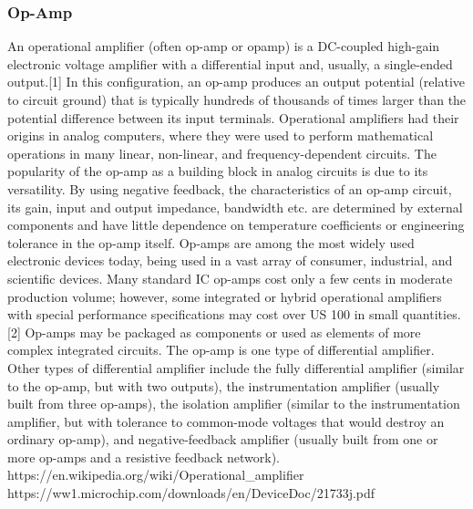 \subsubsection{Op-Amp}
An operational amplifier (often op-amp or opamp) is a DC-coupled high-gain electronic 
voltage amplifier with a differential input and, usually, a single-ended output.[1] In 
this configuration, an op-amp produces an output potential (relative to circuit ground) 
that is typically hundreds of thousands of times larger than the potential difference 
between its input terminals. Operational amplifiers had their origins in analog computers, 
where they were used to perform mathematical operations in many linear, non-linear, and 
frequency-dependent circuits.
The popularity of the op-amp as a building block in analog circuits is due to its 
versatility. By using negative feedback, the characteristics of an op-amp circuit, its 
gain, input and output impedance, bandwidth etc. are determined by external components 
and have little dependence on temperature coefficients or engineering tolerance in the 
op-amp itself.
Op-amps are among the most widely used electronic devices today, being used in a vast 
array of consumer, industrial, and scientific devices. Many standard IC op-amps cost 
only a few cents in moderate production volume; however, some integrated or hybrid 
operational amplifiers with special performance specifications may cost over US 100 in 
small quantities.[2] Op-amps may be packaged as components or used as elements of more 
complex integrated circuits.
The op-amp is one type of differential amplifier. Other types of differential amplifier 
include the fully differential amplifier (similar to the op-amp, but with two outputs), 
the instrumentation amplifier (usually built from three op-amps), the isolation amplifier 
(similar to the instrumentation amplifier, but with tolerance to common-mode voltages 
that would destroy an ordinary op-amp), and negative-feedback amplifier (usually built 
from one or more op-amps and a resistive feedback network).
https://en.wikipedia.org/wiki/Operational_amplifier
https://ww1.microchip.com/downloads/en/DeviceDoc/21733j.pdf


